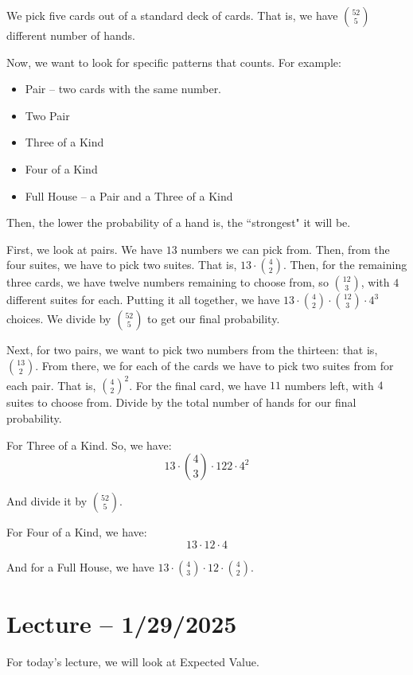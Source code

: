 \documentclass[openany]{book}
\begin{document}
\begin{example}[Poker]
	We pick five cards out of a standard deck of cards. That is, we have $\binom{52}{5}$ different number of hands.
	
	Now, we want to look for specific patterns that counts. For example:
	\begin{itemize}
		\item Pair -- two cards with the same number.
		\item Two Pair
		\item Three of a Kind
		\item Four of a Kind
		\item Full House -- a Pair and a Three of a Kind
	\end{itemize}
	
	Then, the lower the probability of a hand is, the ``strongest" it will be.
	
	First, we look at pairs. We have $13$ numbers we can pick from. Then, from the four suites, we have to pick two suites. That is, $13 \cdot \binom{4}{2}$. Then, for the remaining three cards, we have twelve numbers remaining to choose from, so $\binom{12}{3}$, with $4$ different suites for each. Putting it all together, we have $13 \cdot \binom{4}{2} \cdot \binom{12}{3} \cdot 4^{3}$ choices. We divide by $\binom{52}{5}$ to get our final probability.
	
	Next, for two pairs, we want to pick two numbers from the thirteen: that is, $\binom{13}{2}$. From there, we for each of the cards we have to pick two suites from for each pair. That is, $\binom{4}{2}^{2}$. For the final card, we have $11$ numbers left, with $4$ suites to choose from. Divide by the total number of hands for our final probability.
		
	For Three of a Kind. So, we have:
	\begin{equation*}
		13 \cdot \binom{4}{3} \cdot {12}{2} \cdot 4^{2}
	\end{equation*}
	
	And divide it by $\binom{52}{5}$.
	
	For Four of a Kind, we have:
	\begin{equation*}
		13 \cdot 12 \cdot 4
	\end{equation*}
	
	And for a Full House, we have $13 \cdot \binom{4}{3} \cdot 12 \cdot \binom{4}{2}$.
\end{example}

\section{Lecture -- 1/29/2025}
For today's lecture, we will look at Expected Value.
\end{document}
